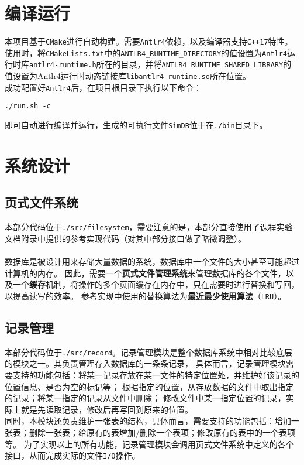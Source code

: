 \documentclass[11pt]{article}
\begin{document}
\section{编译运行}
本项目基于\texttt{CMake}进行自动构建。需要\texttt{Antlr4}依赖，以及编译器支持\texttt{C++17}特性。
使用时，将\texttt{CMakeLists.txt}中的\texttt{ANTLR4\_RUNTIME\_DIRECTORY}的值设置为\texttt{Antlr4}运行时库\texttt{antlr4-runtime.h}所在的目录，并将\texttt{ANTLR4\_RUNTIME\_SHARED\_LIBRARY}的值设置为Antlr4运行时动态链接库\texttt{libantlr4-runtime.so}所在位置。\\
成功配置好\texttt{Antlr4}后，在项目根目录下执行以下命令：
\begin{verbatim}
./run.sh -c
\end{verbatim}
即可自动进行编译并运行，生成的可执行文件\texttt{SimDB}位于在\texttt{./bin}目录下。

\section{系统设计}
\subsection{页式文件系统}
本部分代码位于\texttt{./src/filesystem}，需要注意的是，本部分直接使用了课程实验文档附录中提供的参考实现代码（对其中部分接口做了略微调整）。\\\\
数据库是被设计用来存储大量数据的系统，数据库中一个文件的大小甚至可能超过计算机的内存。
因此，需要一个\textbf{页式文件管理系统}来管理数据库的各个文件，以及一个\textbf{缓存}机制，将操作的多个页面缓存在内存中，只在需要时进行替换和写回，以提高读写的效率。
参考实现中使用的替换算法为\textbf{最近最少使用算法}（\texttt{LRU}）。

\subsection{记录管理}
本部分代码位于\texttt{./src/record}。记录管理模块是整个数据库系统中相对比较底层的模块之一。其负责管理存入数据库的一条条记录，
具体而言，记录管理模块需要支持的功能包括：将某一记录存放在某一文件的特定位置处，并维护好该记录的位置信息、是否为空的标记等；
根据指定的位置，从存放数据的文件中取出指定的记录；将某一指定的记录从文件中删除；
修改文件中某一指定位置的记录，实际上就是先读取记录，修改后再写回到原来的位置。\\

同时，本模块还负责维护一张表的结构，具体而言，需要支持的功能包括：增加一张表；删除一张表；给原有的表增加/删除一个表项；修改原有的表中的一个表项等。
为了实现以上的所有功能，记录管理模块会调用页式文件系统中定义的各个接口，从而完成实际的文件\texttt{I/O}操作。\\
\end{document}
